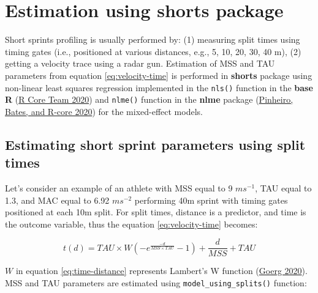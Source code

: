\documentclass[fleqn,10pt,lineno]{wlpeerj} %
\begin{document}
\hypertarget{estimation-using-shorts-package}{%
\section{Estimation using shorts package}\label{estimation-using-shorts-package}}

Short sprints profiling is usually performed by: (1) measuring split times using timing gates (i.e., positioned at various distances, e.g., 5, 10, 20, 30, 40 m), (2) getting a velocity trace using a radar gun. Estimation of MSS and TAU parameters from equation \eqref{eq:velocity-time} is performed in \textbf{shorts} package using non-linear least squares regression implemented in the \texttt{nls()} function in the \textbf{base R} (\protect\hyperlink{ref-R-base}{R Core Team 2020}) and \texttt{nlme()} function in the \textbf{nlme} package (\protect\hyperlink{ref-R-nlme}{Pinheiro, Bates, and R-core 2020}) for the mixed-effect models.

\hypertarget{estimating-short-sprint-parameters-using-split-times}{%
\subsection{Estimating short sprint parameters using split times}\label{estimating-short-sprint-parameters-using-split-times}}

Let's consider an example of an athlete with MSS equal to 9 \(ms^{-1}\), TAU equal to 1.3, and MAC equal to 6.92 \(ms^{-2}\) performing 40m sprint with timing gates positioned at each 10m split. For split times, distance is a predictor, and time is the outcome variable, thus the equation \eqref{eq:velocity-time} becomes:

\begin{equation}
  t(d) = TAU \times W(-e^{\frac{-d}{MSS \times TAU}} - 1) + \frac{d}{MSS} + TAU \label{eq:time-distance}
\end{equation}

\(W\) in equation \eqref{eq:time-distance} represents Lambert's W function (\protect\hyperlink{ref-R-LambertW}{Goerg 2020}). MSS and TAU parameters are estimated using \texttt{model\_using\_splits()} function:
\end{document}
